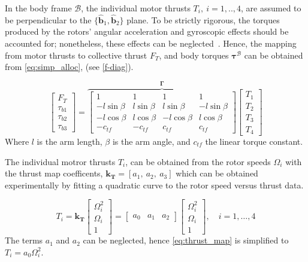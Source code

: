 In the body frame $\mathcal{B}$, the individual motor thrusts $T_i, \ i=1,..,4$, are assumed to be perpendicular to the $\{\hat{\mathbf{b}}_1,\hat{\mathbf{b}}_2\}$ plane.
To be strictly rigorous, the torques produced by the rotors' angular acceleration and gyroscopic effects should be accounted for; nonetheless, these effects can be neglected~\cite{sun_comparative_2024}.
Hence, the mapping from motor thrusts to collective thrust $F_T$, and body torques $\boldsymbol{\tau}^\mathcal{B}$ can be obtained from \eqref{eq:simp_alloc}, (see \autoref{f-diag}).

\begin{equation}
  \begin{bmatrix}
    F_T \\
    \tau_{b1} \\
    \tau_{b2} \\
    \tau_{b3}
  \end{bmatrix} = 
  \overbrace{
  \begin{bmatrix}
    1 & 1 & 1 & 1 \\
    -l\sin{\beta} & l\sin{\beta} & l\sin{\beta} & -l\sin{\beta} \\
    -l\cos{\beta} & l\cos{\beta} & -l\cos{\beta} & l\cos{\beta} \\
    -c_{tf} & -c_{tf} & c_{tf} & c_{tf}
  \end{bmatrix}
  }^{\boldsymbol{\Gamma}}
  \begin{bmatrix}
    T_1 \\ T_2 \\ T_3 \\ T_4
  \end{bmatrix}
  \label{eq:simp_alloc}
\end{equation}
Where $l$ is the arm length, $\beta$ is the arm angle, and $c_{tf}$ the linear torque constant.

The individual motror thrusts $T_i$, can be obtained from the rotor speeds $\Omega_i$ with the thrust map coefficents, $\mathbf{k_T} = [a_1,\ a_2,\ a_3]$ which can be obtained experimentally by fitting a quadratic curve to the rotor speed versus thrust data.

\begin{equation} 
  T_i = \mathbf{k_T} \begin{bmatrix}
    \Omega_i^2 \\ \Omega_i \\ 1
  \end{bmatrix} = \begin{bmatrix}
  a_0 & a_1 & a_2
  \end{bmatrix} \begin{bmatrix}
    \Omega_i^2 \\ \Omega_i \\ 1
  \end{bmatrix}
    \label{eq:thrust_map}, \quad i = 1,\dots,4
\end{equation}
The terms $a_1$ and $a_2$ can be neglected, hence \eqref{eq:thrust_map} is simplified to $ T_i =  a_0 \Omega_i^2$. 


